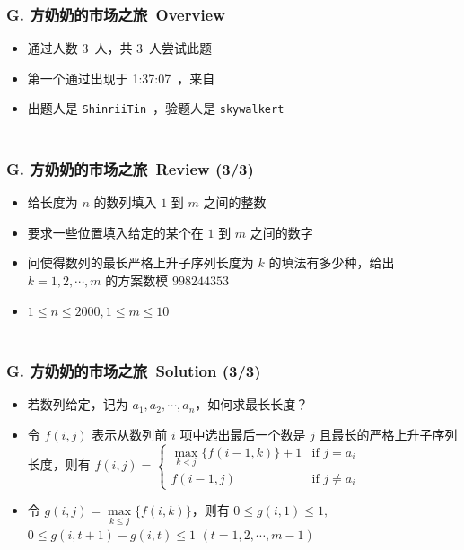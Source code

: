 \documentclass[notheorems]{beamer}
\newcommand{\zhProbG}{方奶奶的市场之旅}	\newcommand{\DiffG}{Very Hard}	\newcommand{\AuthProbG}{\texttt{ShinriiTin}}	\newcommand{\TestProbG}{\texttt{skywalkert}}
\newcommand{\AccInProbG}{3}	\newcommand{\SubInProbG}{3}	\newcommand{\RatInProbG}{100.0\%}
\newcommand{\FirPenInProbG}{1:37:07}		\newcommand{\FirPerInProbG}{\Someone}
\begin{document}
\begin{frame}[label = ProbG]
\frametitle{\\ G. \zhProbG\ Overview}
\begin{spacing}{2.0} \large
\begin{itemize}
\item 通过人数 \AccInProbG\ 人，共 \SubInProbG\ 人尝试此题
\item 第一个通过出现于 \FirPenInProbG\ ，来自 \FirPerInProbG\ 
\item 出题人是 \AuthProbG\ ，验题人是 \TestProbG\
\end{itemize}
\end{spacing}
\end{frame}
\begin{frame}
\frametitle{\\ G. \zhProbG\ Review (\AccInProbG/\SubInProbG)}
\begin{spacing}{2.0} \large
\begin{itemize}
\item 给长度为 $n$ 的数列填入 $1$ 到 $m$ 之间的整数
\item 要求一些位置填入给定的某个在 $1$ 到 $m$ 之间的数字
\item 问使得数列的最长严格上升子序列长度为 $k$ 的填法有多少种，给出 $k = 1, 2, \cdots, m$ 的方案数模 $998244353$
\item $1 \leq n \leq 2000, 1 \leq m \leq 10$
\end{itemize}
\end{spacing}
\end{frame}
\begin{frame}
\frametitle{\\ G. \zhProbG\ Solution (\AccInProbG/\SubInProbG)}
\begin{spacing}{2.0} \large
\begin{itemize}[<+->]
\item 若数列给定，记为 $a_1, a_2, \cdots, a_n$，如何求最长长度？
\item 令 $f(i, j)$ 表示从数列前 $i$ 项中选出最后一个数是 $j$ 且最长的严格上升子序列长度，则有 $f(i, j) = \begin{cases}\max\limits_{k < j}\{f(i - 1, k)\} + 1 &\text{if }j = a_i \\ f(i - 1, j) &\text{if }j \neq a_i\end{cases}$
\item 令 $g(i, j) = \max\limits_{k \leq j}\{f(i, k)\}$，则有 $0 \leq g(i, 1) \leq 1,$ $0 \leq g(i, t + 1) - g(i, t) \leq 1$ $(t = 1, 2, \cdots, m - 1)$
\end{itemize}
\end{spacing}
\end{frame}
\end{document}
